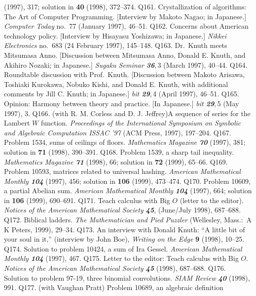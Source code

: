  (1997), 317; solution in {\bf40} (1998), 372--374.
\p Q161. Crystallization of algorithms: The Art of Computer Programming.
 [Interview by Makoto Nagao; in Japanese.] {\sl Computer Today\/} no.~77
 (January 1997), 46--51.
\p Q162. Concerns about American technology policy. [Interview by Hisayasu
 Yoshizawa; in Japanese.] {\sl Nikkei Electronics\/} no.~683 (24 February
 1997), 145--148.
\p Q163. Dr.~Knuth meets Mitsumasa Anno. [Discussion between Mitsumasa Anno,
 Donald E. Knuth, and Akihiro Nozaki; in Japanese.] {\sl Sugaku Seminar\/
 \bf36},\,3 (March 1997), 40--44.
\p Q164. Roundtable discussion with Prof.~Knuth. [Discussion between
 Makoto Arisawa, Toshiaki Kurokawa, Nobuko Kishi, and Donald E. Knuth,
 with additional comments by Jill C. Knuth; in Japanese.]
 {\sl bit\/ \bf29},\,4 (April 1997), 46--51.
\p Q165. Opinion: Harmony between theory and practice. [In Japanese.]
 {\sl bit\/ \bf29},\,5 (May 1997), 3.
\p*Q166. (with R. M. Corless and D. J. Jeffrey)\xskip A sequence of series
 for the Lambert $W$ function. {\sl Proceedings of the International
 Symposium on Symbolic and Algebraic Computation ISSAC '97\/} (ACM Press,
 1997), 197--204.
\p Q167. Problem 1534, sums of ceilings of floors.
 {\sl Mathematics Magazine\/ \bf70} (1997), 381;
 solution in {\bf71} (1998), 390--391.
\p Q168. Problem 1539, a sharp tail inequality.
 {\sl Mathematics Magazine\/ \bf71} (1998), 66;
 solution in {\bf72} (1999), 65--66.
\p Q169. Problem 10593, matrices related to universal hashing.
 {\sl American Mathematical Monthly\/ \bf104} (1997), 456;
 solution in {\bf106} (1999), 473--474.
\p Q170. Problem 10609, a partial Abelian sum.
 {\sl American Mathematical Monthly\/ \bf104} (1997), 664;
 solution in {\bf106} (1999), 690--691.
\p Q171. Teach calculus with Big $O$ (letter to the editor).
 {\sl Notices of the American Mathematical Society\/ \bf45},
 (June/July 1998), 687--688. %
\p Q172. Biblical ladders. {\sl The Mathematician and
 Pied Puzzler\/} (Wellesley, Mass.:\ A K Peters, 1999), 29--34.
\p Q173. An interview with Donald Knuth: ``A little bit of your soul in it,''
 (interview by John Boe), {\sl Writing on the Edge\/} {\bf9} (1998), 10--25.
\p Q174. Solution to problem 10424, a sum of Ira Gessel. {\sl American
 Mathematical Monthly\/ \bf104} (1997), 467.
\p Q175. Letter to the editor: Teach calculus with Big $O$.
 {\sl Notices of the American Mathematical Society\/ \bf45} (1998), 687--688.
\p Q176. Solution to problem 97-19, three binomial convolutions. {\sl SIAM
 Review\/ \bf 40} (1998), 991.
\p Q177. (with Vaughan Pratt) Problem 10689, an algebraic definition
